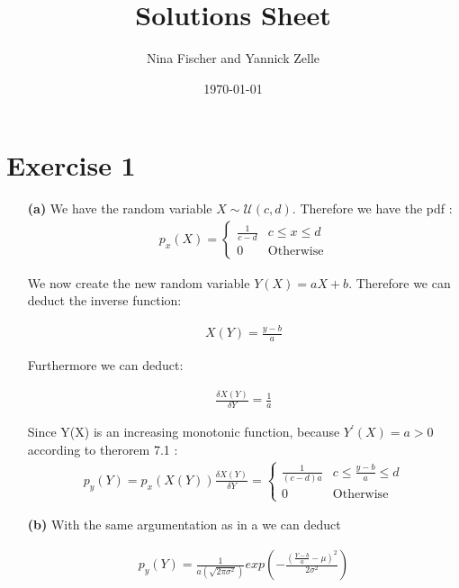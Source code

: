 \documentclass{article}
\title{Solutions Sheet}
\author{Nina Fischer and Yannick Zelle}
\date\today
\begin{document}
\maketitle %




\section*{Exercise 1}
\begin{itemize}
    \item [\textbf{(a)}] We have the random variable $X \sim \mathcal{U}(c,d)$. Therefore we have the pdf :
 \begin{align*}
 p_x(X) =   \begin{cases}
    \frac{1}{c-d} &c \leq x \leq d \\
    0 &\text{Otherwise}
    \end{cases}
\end{align*}

We now create the new random variable $Y(X)=aX+b$. Therefore we can deduct the inverse function:

\begin{align*}
    X(Y) = \frac{y-b}{a}
\end{align*}

Furthermore we can deduct:

\begin{align*}
    \frac{\delta X(Y)}{\delta Y} = \frac{1}{a}
\end{align*}

Since Y(X) is an increasing monotonic function, because $Y^{\prime}(X)=a>0$ according to therorem 7.1 :
\begin{align*}
p_y(Y) = p_x(X(Y)) \frac{\delta X(Y)}{\delta Y} = \begin{cases}
    \frac{1}{(c-d)a} &c \leq \frac{y-b}{a} \leq d \\
    0 &\text{Otherwise}
    \end{cases}
\end{align*}

\item[\textbf{(b)}] With the same argumentation as in a we can deduct

\begin{align*}
    p_y(Y)= \frac{1}{a(\sqrt{2\pi \sigma^2})}exp(-\frac{(\frac{Y-b}{a}- \mu)^2}{2 \sigma^2})
\end{align*}  
\end{itemize}
\end{document}
